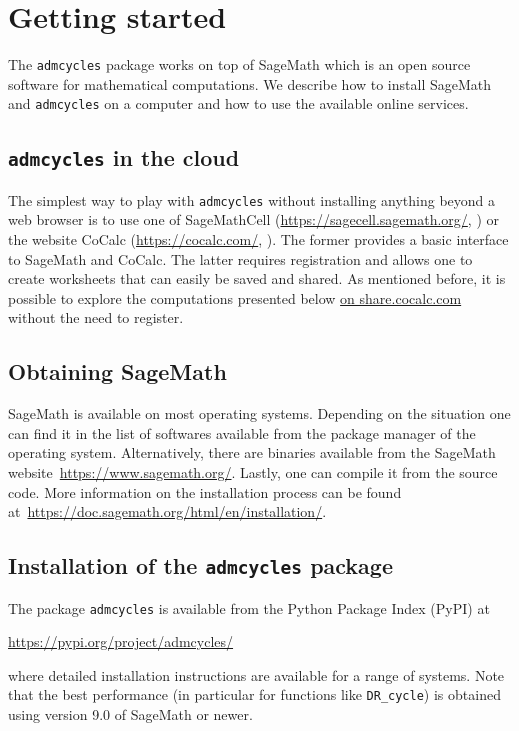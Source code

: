 \documentclass[11pt]{article}
\newcommand{\Sage}{SageMath}
\newcommand{\cocalc}{CoCalc}
\newcommand{\sagecell}{SageMathCell}
\newcommand{\admcycles}{\texttt{admcycles}}
\begin{document}
\section{Getting started}
The \admcycles{} package works on top of \Sage{} which is an open source software for mathematical computations. We describe how to install \Sage{} and \admcycles{} on a computer and how to use the available online services.

\subsection{\admcycles{} in the cloud}
The simplest way to play with \admcycles{} without installing anything beyond a web browser is to use one of \sagecell{} (\url{https://sagecell.sagemath.org/}, \cite{SageMathCell}) or the website \cocalc{} (\url{https://cocalc.com/}, \cite{CoCalc}). The former provides a basic interface to \Sage{} and \cocalc{}. The latter requires registration and allows one to create worksheets that can easily be saved and shared. As mentioned before, it is possible to explore the computations presented below  \href{https://share.cocalc.com/share/0a48957b67f375b9e3107216504ca0c4efb678fd/admcycles%20tutorial.ipynb?viewer=share}{on share.cocalc.com} without the need to register.


\subsection{Obtaining \Sage{}}
\Sage{} is available on most operating systems. Depending on the situation one can find it in the list of softwares available from the package manager of the operating system. Alternatively, there are binaries available from the \Sage{} website~\url{https://www.sagemath.org/}. Lastly, one can compile it from the source code. More information on the installation process can be found at~\url{https://doc.sagemath.org/html/en/installation/}.

\subsection{Installation of the \admcycles{} package}
The package \texttt{admcycles} is available from the Python Package Index (PyPI) at
\begin{center}
    \url{https://pypi.org/project/admcycles/}
\end{center}
where detailed installation instructions are available for a range of systems. Note that the best performance (in particular for functions like \verb|DR_cycle|) is obtained using version 9.0 of \Sage{} or newer.
\end{document}
